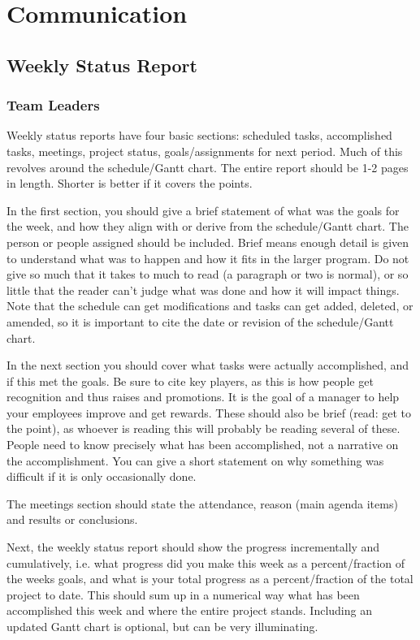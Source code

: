 \chapter{Communication}

\section{Weekly Status Report}
\subsection{Team Leaders}
Weekly status reports have four basic sections: scheduled tasks, accomplished tasks, meetings, project status, goals/assignments for next period.  Much of this revolves around the schedule/Gantt chart.  The entire report should be 1-2 pages in length.  Shorter is better if it covers the points.

In the first section, you should give a brief statement of what was the goals for the week, and how they align with or derive from the schedule/Gantt chart.  The person or people assigned should be included.  Brief means enough detail is given to understand what was to happen and how it fits in the larger program.  Do not give so much that it takes to much to read (a paragraph or two is normal), or so little that the reader can't judge what was done and how it will impact things.  Note that the schedule can get modifications and tasks can get added, deleted, or amended, so it is important to cite the date or revision of the schedule/Gantt chart.

In the next section you should cover what tasks were actually accomplished, and if this met the goals.  Be sure to cite key players, as this is how people get recognition and thus raises and promotions.  It is the goal of a manager to help your employees improve and get rewards.  These should also be brief (read: get to the point), as whoever is reading this will probably be reading several of these.  People need to know precisely what has been accomplished, not a narrative on the accomplishment.  You can give a short statement on why something was difficult if it is only occasionally done.

The meetings section should state the attendance, reason (main agenda items) and results or conclusions.

Next, the weekly status report should show the progress incrementally and cumulatively, i.e. what progress did you make this week as a percent/fraction of the weeks goals, and what is your total progress as a percent/fraction of the total project to date.  This should sum up in a numerical way what has been accomplished this week and where the entire project stands.  Including an updated Gantt chart is optional, but can be very illuminating.

